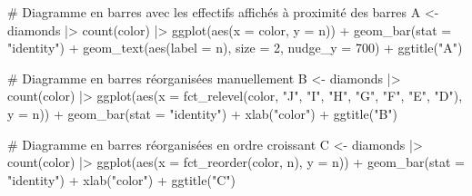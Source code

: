 \documentclass[
  letterpaper,
]{book}
\newenvironment{Shaded}{\begin{snugshade}}{\end{snugshade}}
\newcommand{\AttributeTok}[1]{\textcolor[rgb]{0.40,0.45,0.13}{#1}}
\newcommand{\CommentTok}[1]{\textcolor[rgb]{0.37,0.37,0.37}{#1}}
\newcommand{\DecValTok}[1]{\textcolor[rgb]{0.68,0.00,0.00}{#1}}
\newcommand{\FunctionTok}[1]{\textcolor[rgb]{0.28,0.35,0.67}{#1}}
\newcommand{\NormalTok}[1]{\textcolor[rgb]{0.00,0.23,0.31}{#1}}
\newcommand{\OtherTok}[1]{\textcolor[rgb]{0.00,0.23,0.31}{#1}}
\newcommand{\SpecialCharTok}[1]{\textcolor[rgb]{0.37,0.37,0.37}{#1}}
\newcommand{\StringTok}[1]{\textcolor[rgb]{0.13,0.47,0.30}{#1}}
\begin{document}
\begin{Shaded}
\begin{Highlighting}[]
\CommentTok{\# Diagramme en barres avec les effectifs affichés à proximité des barres}
\NormalTok{A }\OtherTok{\textless{}{-}} 
\NormalTok{  diamonds }\SpecialCharTok{|\textgreater{}}
  \FunctionTok{count}\NormalTok{(color) }\SpecialCharTok{|\textgreater{}}
  \FunctionTok{ggplot}\NormalTok{(}\FunctionTok{aes}\NormalTok{(}\AttributeTok{x =}\NormalTok{ color, }\AttributeTok{y =}\NormalTok{ n)) }\SpecialCharTok{+}
     \FunctionTok{geom\_bar}\NormalTok{(}\AttributeTok{stat =} \StringTok{"identity"}\NormalTok{) }\SpecialCharTok{+}
     \FunctionTok{geom\_text}\NormalTok{(}\FunctionTok{aes}\NormalTok{(}\AttributeTok{label =}\NormalTok{ n), }\AttributeTok{size =} \DecValTok{2}\NormalTok{, }\AttributeTok{nudge\_y =} \DecValTok{700}\NormalTok{) }\SpecialCharTok{+}
     \FunctionTok{ggtitle}\NormalTok{(}\StringTok{"A"}\NormalTok{)}

\CommentTok{\# Diagramme en barres réorganisées manuellement}
\NormalTok{B }\OtherTok{\textless{}{-}} 
\NormalTok{  diamonds }\SpecialCharTok{|\textgreater{}}
  \FunctionTok{count}\NormalTok{(color) }\SpecialCharTok{|\textgreater{}}
  \FunctionTok{ggplot}\NormalTok{(}\FunctionTok{aes}\NormalTok{(}\AttributeTok{x =} \FunctionTok{fct\_relevel}\NormalTok{(color, }\StringTok{"J"}\NormalTok{, }\StringTok{"I"}\NormalTok{, }\StringTok{"H"}\NormalTok{, }\StringTok{"G"}\NormalTok{, }\StringTok{"F"}\NormalTok{, }\StringTok{"E"}\NormalTok{, }\StringTok{"D"}\NormalTok{), }
             \AttributeTok{y =}\NormalTok{ n)) }\SpecialCharTok{+}
     \FunctionTok{geom\_bar}\NormalTok{(}\AttributeTok{stat =} \StringTok{"identity"}\NormalTok{) }\SpecialCharTok{+}
     \FunctionTok{xlab}\NormalTok{(}\StringTok{"color"}\NormalTok{) }\SpecialCharTok{+}
     \FunctionTok{ggtitle}\NormalTok{(}\StringTok{"B"}\NormalTok{) }

\CommentTok{\# Diagramme en barres réorganisées en ordre croissant}
\NormalTok{C }\OtherTok{\textless{}{-}} 
\NormalTok{  diamonds }\SpecialCharTok{|\textgreater{}}
  \FunctionTok{count}\NormalTok{(color) }\SpecialCharTok{|\textgreater{}}
  \FunctionTok{ggplot}\NormalTok{(}\FunctionTok{aes}\NormalTok{(}\AttributeTok{x =} \FunctionTok{fct\_reorder}\NormalTok{(color, n), }\AttributeTok{y =}\NormalTok{ n)) }\SpecialCharTok{+}
     \FunctionTok{geom\_bar}\NormalTok{(}\AttributeTok{stat =} \StringTok{"identity"}\NormalTok{) }\SpecialCharTok{+}
     \FunctionTok{xlab}\NormalTok{(}\StringTok{"color"}\NormalTok{) }\SpecialCharTok{+}
     \FunctionTok{ggtitle}\NormalTok{(}\StringTok{"C"}\NormalTok{) }


\end{Highlighting}
\end{Shaded}
\end{document}
